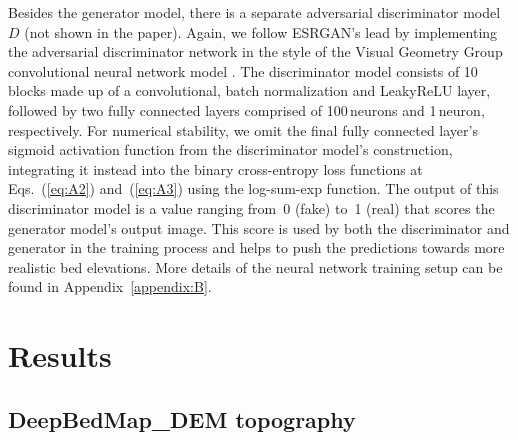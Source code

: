 \documentclass[tc, noline]{copernicus}
\begin{document}
Besides the generator model, there is a separate adversarial discriminator model $D$ (not shown in the paper). Again, we follow ESRGAN's
\citep{WangESRGANEnhancedSuperResolution2019} lead by implementing the adversarial discriminator network in the style of the Visual Geometry Group
convolutional neural network model \citep[VGG;][]{SimonyanVeryDeepConvolutional2014}. The discriminator model consists of 10 blocks made up of a
convolutional, batch normalization \citep{IoffeBatchNormalizationAccelerating2015} and LeakyReLU \citep{MaasRectifiernonlinearitiesimprove2013} layer,
followed by two fully connected layers comprised of 100\,\unit{neurons} and 1\,\unit{neuron}, respectively. For numerical stability, we omit the final
fully connected layer's sigmoid activation function from the discriminator model's construction, integrating it instead into the binary cross-entropy
loss functions at Eqs.~(\ref{eq:A2}) and~(\ref{eq:A3}) using the log-sum-exp function. The output of this discriminator model is a value ranging
from~0 (fake) to~1 (real) that scores the generator model's output image. This score is used by both the discriminator and generator in the training
process and helps to push the predictions towards more realistic bed elevations. More details of the neural network training setup can be found in
Appendix~\ref{appendix:B}.


\section{Results}

\subsection{DeepBedMap\_DEM topography}\label{section:deepbedmapdemtopography}
\end{document}
